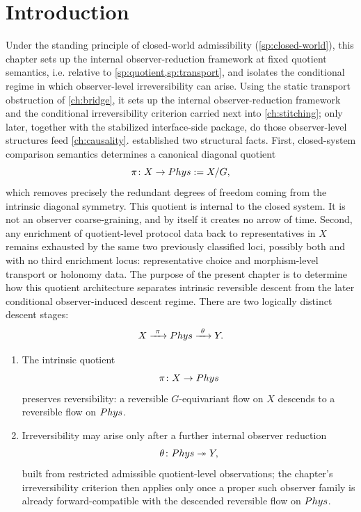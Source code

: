 \section{Introduction}
Under the standing principle of closed-world admissibility
(\cref{sp:closed-world}), this chapter sets up the internal
observer-reduction framework at fixed quotient semantics, i.e.
relative to \cref{sp:quotient,sp:transport}, and isolates the
conditional regime in which observer-level irreversibility can
arise.
Using the static transport obstruction of \cref{ch:bridge}, it sets
up the internal observer-reduction framework and the conditional
irreversibility criterion carried next into \cref{ch:stitching};
only later, together with the stabilized interface-side package, do
those observer-level structures feed \cref{ch:causality}.
established two structural facts.
First, closed-system comparison semantics determines a canonical diagonal
quotient
\[
	\pi\colon X\to Phys:=X/G,
\]
which removes precisely the redundant degrees of freedom coming from the
intrinsic diagonal symmetry. This quotient is internal to the closed
system. It is not an observer coarse-graining, and by itself it creates
no arrow of time.
Second, any enrichment of quotient-level protocol data back to
representatives in \(X\) remains exhausted by the same two previously
classified loci, possibly both and with no third enrichment locus:
representative choice and morphism-level transport or holonomy data.
The purpose of the present chapter is to determine how this quotient
architecture separates intrinsic reversible descent from the later
conditional observer-induced descent regime.
There are two logically distinct descent stages:
\[
	X\xrightarrow{\ \pi\ }\Phys\xrightarrow{\ \theta\ }Y.
\]
\begin{enumerate}[label=\textup{(\roman*)}]
	\item
	      The intrinsic quotient
	      \[
		      \pi\colon X\to Phys
	      \]
	      preserves reversibility: a reversible \(G\)-equivariant flow on \(X\)
	      descends to a reversible flow on \(Phys\).
	\item
	      Irreversibility may arise only after a further internal observer
	      reduction
	      \[
		      \theta\colon Phys\twoheadrightarrow Y,
	      \]
	      built from restricted admissible quotient-level observations;
	      the chapter's irreversibility criterion then applies only once a
	      proper such observer family is already forward-compatible with
	      the descended reversible flow on \(Phys\).
\end{enumerate}
